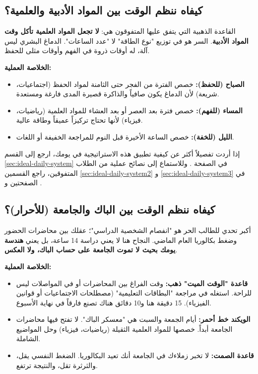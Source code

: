 \documentclass[12pt,a4paper]{book}
\newcommand{\importantAr}[1]{%
	\begin{important}
		\bfseries #1
	\end{important}
}
\begin{document}
	\subsection{كيفاه ننظم الوقت بين المواد الأدبية والعلمية؟}
	
	القاعدة الذهبية التي يتفق عليها المتفوقون هي: \textbf{لا تجعل المواد العلمية تأكل وقت المواد الأدبية}. السر هو في توزيع "نوع الطاقة" لا "عدد الساعات". الدماغ البشري ليس آلة، له أوقات ذروة في الفهم وأوقات مثلى للحفظ.
	
	\importantAr{الخلاصة العملية:}
	\begin{itemize}
		\item \textbf{الصباح (للحفظ):} خصص الفترة من الفجر حتى الثامنة لمواد الحفظ (اجتماعيات، شريعة) لأن الدماغ يكون صافياً والذاكرة قصيرة المدى فارغة ومستعدة.
		\item \textbf{المساء (للفهم):} خصص فترة بعد العصر أو بعد العشاء للمواد العلمية (رياضيات، فيزياء) لأنها تحتاج تركيزاً عميقاً وطاقة عالية.
		\item \textbf{الليل (للخفة):} خصص الساعة الأخيرة قبل النوم للمراجعة الخفيفة أو اللغات.
	\end{itemize}
	
	إذا أردت تفصيلاً أكثر عن كيفية تطبيق هذه الاستراتيجية في يومك، ارجع إلى القسم \ref{sec:ideal-daily-system} في الصفحة \pageref{sec:ideal-daily-system}. وللاستماع إلى نصائح عملية من الطلاب المتفوقين، راجع القسمين \ref{sec:ideal-daily-system2} و \ref{sec:ideal-daily-system3} في الصفحتين \pageref{sec:ideal-daily-system2} و \pageref{sec:ideal-daily-system3}.
	
	\subsection{كيفاه ننظم الوقت بين الباك والجامعة (للأحرار)؟}
	\label{sec:free-candidate-time}
	
	أكبر تحدي للطالب الحر هو "انفصام الشخصية الدراسي"؛ عقلك بين محاضرات الحضور وضغط بكالوريا العام الماضي. النجاح هنا لا يعني دراسة 14 ساعة، بل يعني \textbf{هندسة يومك بحيث لا تموت الجامعة على حساب الباك، ولا العكس}.
	
	\importantAr{الخلاصة العملية:}
	\begin{itemize}
		\item \textbf{قاعدة "الوقت الميت" ذهب:} وقت الفراغ بين المحاضرات أو في المواصلات ليس للراحة. استغله في مراجعة "البطاقات التعليمية" (مصطلحات الاجتماعيات أو قوانين الفيزياء). 15 دقيقة هنا و10 دقائق هناك تصنع فارقاً في نهاية الأسبوع.
		\item \textbf{الويكند خط أحمر:} أيام الجمعة والسبت هي "معسكر الباك". لا تفتح فيها محاضرات الجامعة أبداً. خصصها للمواد العلمية الثقيلة (رياضيات، فيزياء) وحل المواضيع الشاملة.
		\item \textbf{قاعدة الصمت:} لا تخبر زملاءك في الجامعة أنك تعيد البكالوريا. الضغط النفسي يقل، والثرثرة تقل، والنتيجة ترتفع.
	\end{itemize}
	
\end{document}
